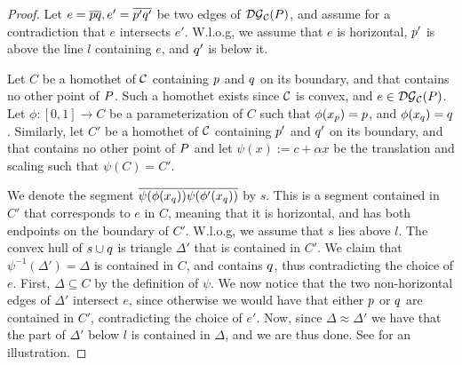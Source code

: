 \documentclass[12pt]{article}%
\begin{document}
\begin{proof}
	Let $e=\overline{pq}, e'=\overline{p'q'}$ be two edges of $\mathcal{DG}_{\mathcal{C}}(P)$, and assume for a contradiction that $e$ intersects $e'$. W.l.o.g, we assume that $e$ is horizontal, $p'$ is above the line $l$ containing $e$, and $q'$ is below it.
	
	Let $C$ be a homothet of $\mathcal{C}$ containing $p$ and $q$ on its boundary, and that contains no other point of $P$. Such a homothet exists since $\mathcal{C}$ is convex, and $e\in \mathcal{DG}_{\mathcal{C}}(P)$.  Let $\phi : [0,1] \longrightarrow C$ be a parameterization of $C$ such that $\phi(x_p)=p$, and $\phi(x_q)=q$. Similarly, let $C'$ be a homothet of $\mathcal{C}$ containing $p'$ and $q'$ on its boundary, and that contains no other point of $P$ and let $\psi(x):= c + \alpha x$ be the translation and scaling such that $\psi(C) = C'$.
	
	We denote the segment $\overline{\psi(\phi(x_q))\psi(\phi'(x_q))}$ by $s$. This is a segment contained in $C'$ that corresponds to $e$ in $C$, meaning that it is horizontal, and has both endpoints on the boundary of $C'$. W.l.o.g, we assume that $s$ lies above $l$. The convex hull of $s\cup q$ is triangle $\Delta'$ that is contained in $C'$. We claim that $\psi^{-1}(\Delta')=\Delta$ is contained in $C$, and contains $q$, thus contradicting the choice of $e$. First, $\Delta\subseteq C$ by the definition of $\psi$. We now notice that the two non-horizontal edges of $\Delta'$ intersect $e$, since otherwise we would have that either $p$ or $q$ are contained in $C'$, contradicting the choice of $e'$. Now, since $\Delta \approx \Delta'$ we have that the part of $\Delta'$ below $l$ is contained in $\Delta$, and we are thus done. See  for an illustration.
	
\end{proof}
\end{document}
